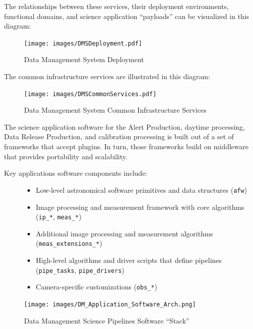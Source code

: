 \documentclass[DM,lsstdraft,toc]{lsstdoc}
\begin{document}
The relationships between these services, their deployment environments,
functional domains, and science application ``payloads'' can be
visualized in this diagram:

\begin{figure}
\centering
\texttt{[image: images/DMSDeployment.pdf]}
\caption{Data Management System Deployment}
\end{figure}

The common infrastructure services are illustrated in this diagram:

\begin{figure}
\centering
\texttt{[image: images/DMSCommonServices.pdf]}
\caption{Data Management System Common Infrastructure Services}
\end{figure}

The science application software for the Alert Production, daytime
processing, Data Release Production, and calibration processing is built
out of a set of frameworks that accept plugins. In turn, those
frameworks build on middleware that provides portability and
scalability.

\begin{description}
\item[Key applications software components include:]
\begin{itemize}
\tightlist
\item
  Low-level astronomical software primitives and data structures
  (\texttt{afw})
\item
  Image processing and measurement framework with core algorithms
  (\texttt{ip\_*}, \texttt{meas\_*})
\item
  Additional image processing and measurement algorithms
  (\texttt{meas\_extensions\_*})
\item
  High-level algorithms and driver scripts that define pipelines
  (\texttt{pipe\_tasks}, \texttt{pipe\_drivers})
\item
  Camera-specific customizations (\texttt{obs\_*})
\end{itemize}
\end{description}

\begin{figure}
\centering
\texttt{[image: images/DM\_Application\_Software\_Arch.png]}
\caption{Data Management Science Pipelines Software ``Stack''}
\end{figure}
\end{document}
